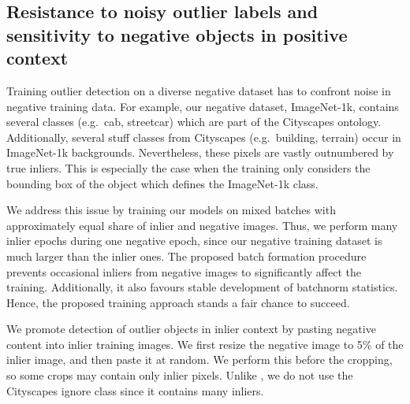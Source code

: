 \documentclass[runningheads]{llncs}
\begin{document}
\subsection{Resistance to noisy outlier labels and sensitivity
to negative objects in positive context}

Training outlier detection on 
a diverse negative dataset
has to confront noise 
in negative training data.
For example, our negative dataset, ImageNet-1k, 
contains several classes (e.g.\ cab, streetcar)
which are part of the Cityscapes ontology.
Additionally, several stuff 
classes from Cityscapes
(e.g.\ building, terrain) 
occur in ImageNet-1k backgrounds.
Nevertheless, these pixels 
are vastly outnumbered by true inliers.
This is especially the case
when the training only considers 
the bounding box of the object 
which defines the ImageNet-1k class.


We address this issue 
by training our models 
on mixed batches 
with approximately equal share 
of inlier and negative images.
Thus, we perform many inlier epochs
during one negative epoch,
since our negative training dataset 
is much larger than the inlier ones. 
The proposed batch formation procedure
prevents occasional inliers from negative images
to significantly affect the training.
Additionally, it also favours 
stable development of batchnorm statistics.
Hence, the proposed training approach 
stands a fair chance to succeed.

\begin{comment}
We alleviate influence of noisy outliers
by forming batches with approximately 
equal share of inlier and negative images.
Consequently, a relatively small number 
of negative images with inlier pixels
can not significantly affect the training.
In practice, ImageNet-1k contains 
several classes (e.g.\ cab, streetcar)
which are part of the Cityscapes ontology.
Additionally, several stuff 
classes from Cityscapes
(e.g.\ building, terrain) 
occur in ImageNet-1k backgrounds.
Nevertheless, these pixels 
are vastly outnumbered by true outliers.
Hence, the proposed training approach 
stands a fair chance to succeed.
\end{comment}

We promote detection 
of outlier objects in inlier context
by pasting negative content 
into inlier training images.
We first resize the negative image 
to 5\% of the inlier image,
and then paste it at random.
We perform this before the cropping,
so some crops may contain only inlier pixels.
Unlike \cite{blum19arxiv},
we do not use the Cityscapes ignore class 
since it contains many inliers.
\end{document}
